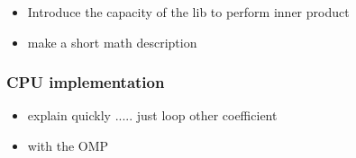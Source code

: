 \documentclass[oribibl]{llncs2e/llncs}
\begin{document}
\begin{itemize}
\item Introduce the capacity of the lib to perform inner product 
\item make a short math description 
\end{itemize}



\subsubsection{CPU implementation}
\begin{itemize}
\item   explain quickly ..... just loop other coefficient 
\item  with the OMP 
\end{itemize}
\end{document}
